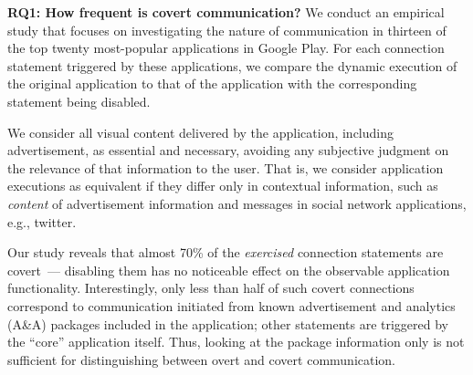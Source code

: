 \noindent 
{\bf RQ1: How frequent is covert communication?} %
We conduct an empirical study that focuses on %
investigating the nature of communication in thirteen of the 
top twenty most-popular applications in Google Play.  
For each connection statement triggered by these applications, we compare the dynamic execution of the original application to that of the application with the corresponding statement being disabled. 

We consider all visual content delivered by the application, including advertisement, as essential and necessary, avoiding any subjective judgment on the relevance of that information to the user.  
That is, we consider application executions as
equivalent if they %
differ only in contextual information, such as   
\emph{content} of advertisement information and messages in social network
applications, e.g., twitter.

Our study reveals that almost 70\% of
the \emph{exercised} connection statements are covert~--- disabling
them has no noticeable effect on the observable application
functionality. Interestingly, only less than half of such covert connections correspond to communication initiated from known advertisement and analytics (A\&A) packages included in the application; other statements are triggered by the ``core'' application itself. 
Thus, looking at the package information only is not sufficient for distinguishing between
overt and covert communication. 


